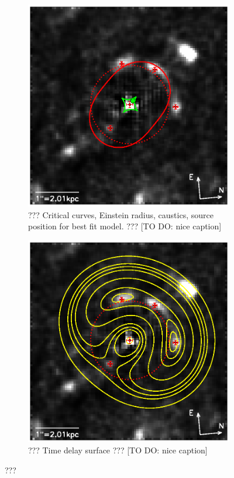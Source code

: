 \documentclass[useAMS,usenatbib]{mn2e}
\begin{document}
\begin{figure}
\centering
\begin{subfigure}{.5\textwidth}
  \centering
  \includegraphics[width=.9\linewidth]{fig/lens_einstein.ps}
  \caption{??? Critical curves, Einstein radius, caustics, source position for best fit model. ??? [TO DO: nice caption]}
  \label{fig:lensbestfiteinsteincurves}
\end{subfigure}%
\begin{subfigure}{.5\textwidth}
  \centering
  \includegraphics[width=.9\linewidth]{fig/lens_timedelay.ps}
  \caption{??? Time delay surface ??? [TO DO: nice caption]}
  \label{fig:lensbestfittimedelay}
\end{subfigure}
\caption{???}
\label{fig:???}
\end{figure}
\end{document}
